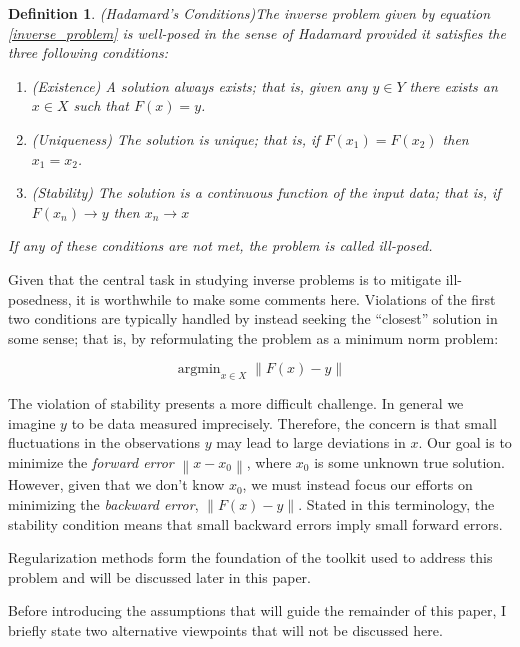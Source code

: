 \documentclass[12pt]{article}
\newcommand*{\norm}[1]{\left\lVert#1\right\rVert}
\DeclareMathOperator*{\argmin}{argmin}
\newtheorem*{definition}{Definition}
\begin{document}
\begin{definition} 
(Hadamard's Conditions)The inverse problem given by equation \ref{inverse_problem} is well-posed in the sense of Hadamard 
provided it satisfies the three following conditions:
\begin{enumerate} 
\item (Existence) A solution always exists; that is, given any $y \in Y$ there exists an $x \in X$ such that $F(x) = y$. 
\item (Uniqueness) The solution is unique; that is, if $F(x_1) = F(x_2)$ then $x_1 = x_2$.
\item (Stability) The solution is a continuous function of the input data; that is, if $F(x_n) \to y$  then $x_n \to x$
\end{enumerate} 
If any of these conditions are not met, the problem is called ill-posed. 
\end{definition} 

Given that the central task in studying inverse problems is to mitigate ill-posedness, it is worthwhile to make some comments here. 
Violations of the first two conditions are typically handled by 
instead seeking the ``closest'' solution in some sense; that is, by reformulating the problem as a minimum norm problem: 

\begin{equation}
\argmin_{x \in X} \norm{F(x) - y} \label{min_norm}
\end{equation}

 The violation of stability presents a more difficult challenge. In general we imagine $y$ to be data measured imprecisely. 
 Therefore, the concern is that small fluctuations in the observations $y$ may lead to large deviations in $x$. 
Our goal is to minimize the \textit{forward error} $\norm{x - x_0}$, where $x_0$ is some unknown true solution. However, 
given that we don't know $x_0$, we must instead focus our efforts on minimizing the \textit{backward error}, $\norm{F(x) - y}$. 
Stated in this terminology, the stability condition means that small backward errors imply small forward errors. 

 Regularization methods form the foundation of the toolkit used to address this problem and will be discussed later in this paper. 



Before introducing the assumptions that will guide the remainder of this paper, I briefly
state two alternative viewpoints that will not be discussed here. 
\end{document}
